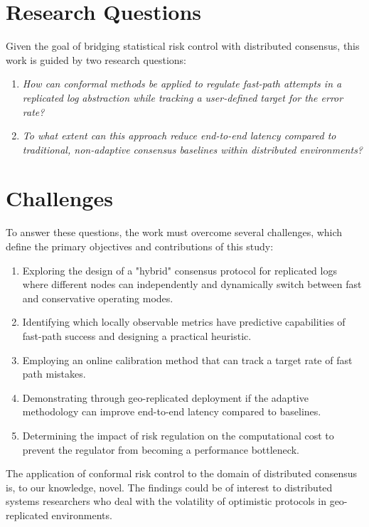 \section{Research Questions}
\label{sec:research_questions}
Given the goal of bridging statistical risk control with distributed consensus, this work is guided by two research questions:

\begin{enumerate}[label=\textbf{\Roman*.}]
    \item \textit{How can conformal methods be applied to regulate fast-path attempts in a replicated log abstraction while tracking a user-defined target for the error rate?}
    \item \textit{To what extent can this approach reduce end-to-end latency compared to traditional, non-adaptive consensus baselines within distributed environments?}
\end{enumerate}


\section{Challenges}
To answer these questions, the work must overcome several challenges, which define the primary objectives and contributions of this study:
\begin{enumerate}
    \item Exploring the design of a "hybrid" consensus protocol for replicated logs where different nodes can independently and dynamically switch between fast and conservative operating modes.
    \item Identifying which locally observable metrics have predictive capabilities of fast-path success and designing a practical heuristic.
    \item Employing an online calibration method that can track a target rate of fast path mistakes.
    \item Demonstrating through geo-replicated deployment if the adaptive methodology can improve end-to-end latency compared to baselines.
    \item Determining the impact of risk regulation on the computational cost to prevent the regulator from becoming a performance bottleneck.
\end{enumerate}

The application of conformal risk control to the domain of distributed consensus is, to our knowledge, novel. The findings could be of interest to distributed systems researchers who deal with the volatility of optimistic protocols in geo-replicated environments. 


